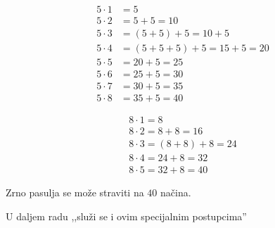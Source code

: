     \begin{multicols}{2}

    \begin{align*}

        5 \cdot 1 &= 5 \\

        5 \cdot 2 &= 5 + 5 = 10\\

        5 \cdot 3 &= (5 + 5) + 5 = 10 + 5\\

        5 \cdot 4 &= (5 + 5 + 5) + 5 = 15 + 5 = 20\\

        5 \cdot 5 &= 20 + 5 = 25\\

        5 \cdot 6 &= 25 + 5 = 30\\

        5 \cdot 7 &= 30 + 5 = 35\\

        5 \cdot 8 &= 35 + 5 = 40

    \end{align*}

    \break

    \begin{align*}

        8 \cdot 1 = 8 \\

        8 \cdot 2 = 8 + 8 = 16 \\

        8 \cdot 3 = (8 + 8) + 8 = 24 \\

        8 \cdot 4 = 24 + 8 = 32 \\

        8 \cdot 5 = 32 + 8 = 40

    \end{align*}

    \end{multicols}

    Zrno pasulja se mo\v ze straviti na $40$ na\v cina.



    \begin{zad}

    U daljem radu ,,slu\v zi se i ovim specijalnim postupcima'' %

    \end{zad}

